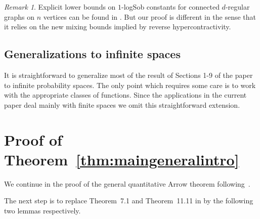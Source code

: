\documentclass[11pt]{amsart}
\newcommand{\1}{\mathbf{1}}
\theoremstyle{definition}
\theoremstyle{plain}
\theoremstyle{remark}
\newtheorem{remark}[example]{Remark}
\numberwithin{equation}{section}
\begin{document}
\begin{remark}
Explicit lower bounds on  $1$-logSob constants for connected $d$-regular graphs on $n$ vertices   can  be found in \cite{Goel04, BobkovTetali06}. But our proof is different in the sense that it relies on the new mixing bounds implied by reverse hypercontractivity. 

\end{remark}
\subsection{Generalizations to infinite spaces}
It is straightforward to generalize most of the result of Sections 1-9 of the paper to infinite probability spaces.
The only point which requires some care is to work with the appropriate classes of functions.
Since  the applications in the current paper deal mainly with finite spaces we omit this straightforward extension.




\appendix










%





\section{Proof of Theorem~\ref{thm:maingeneralintro}} \label{a:arrow}
We continue in the proof of the  general quantitative Arrow theorem following~\cite{Mossel11}.

The next step is to replace Theorem~7.1 and Theorem~11.11 in \cite{Mossel11}
by the following two lemmas respectively.
\end{document}
